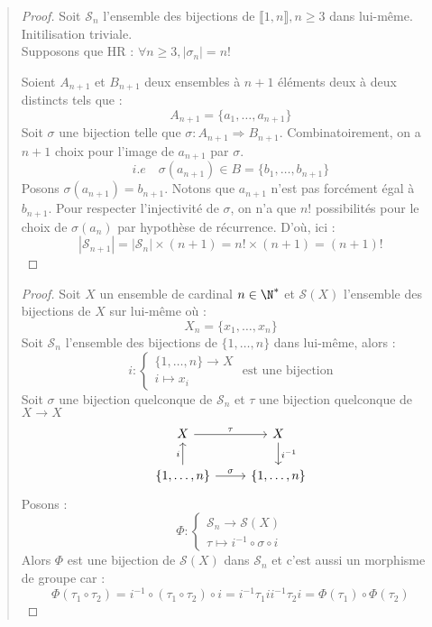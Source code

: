 \begin{quote}
	\footnotesize
	\begin{proof}
		Soit $\mathcal{S}_n$ l'ensemble des bijections de $\llbracket 1,n \rrbracket, n \geq 3$ dans lui-même.
		Initilisation triviale. \\
		Supposons que HR : $ \forall n \geq 3, | \sigma_n | = n ! $

		Soient $A_{n+1}$ et $B_{n+1}$ deux ensembles à $n+1$ éléments deux à deux distincts tels que :
			\[ A_{n+1} = \{a_1, \dots, a_{n+1} \} \]
		Soit $\sigma$ une bijection telle que $ \sigma : A_{n+1} \Longrightarrow B_{n+1}$.
		Combinatoirement, on a $n+1$ choix pour l'image de $a_{n+1}$ par $\sigma$.
			\[ i.e \quad \sigma(a_{n+1}) \in B = \{b_1, \dots, b_{n+1} \} \]
		Posons $ \sigma(a_{n+1}) = b_{n+1}$. Notons que $a_{n+1}$ n'est pas forcément égal à $b_{n+1}$.
		Pour respecter l'injectivité de $\sigma$, on n'a que $n !$ possibilités pour le choix de $\sigma(a_n)$ par hypothèse de récurrence.
		D'où, ici :
			\[ |\mathcal{S}_{n+1}| = |\mathcal{S}_n| \times (n+1) = n! \times (n+1) = (n+1)! \]
	\end{proof}
	\begin{proof}
		Soit $X$ un ensemble de cardinal $n \in \N^*$ et $\mathcal{S}(X)$ l'ensemble des bijections de $X$ sur lui-même où :
			\[ X_n = \{x_1, \dots, x_n \} \]
		Soit $\mathcal{S}_n$ l'ensemble des bijections de $\{1, \dots, n\}$ dans lui-même, alors :
			\[ i :  
				\begin{cases}
					\{1,\dots,n\} \longrightarrow X \\
					i \longmapsto x_i 
				\end{cases}  \text{ est une bijection} \]
		Soit $\sigma$ une bijection quelconque de $\mathcal{S}_n$ et $\tau$ une bijection quelconque de $ X \longrightarrow X$ 
		$$
		\begin{tikzcd}
			X \arrow[r, "\tau"]
				& X \arrow[d, "i^{-1}"] \\
			\{1,\dots,n\} \arrow[r, "\sigma"] \arrow[u, "i"] 
				& \{1,\dots,n\}
		\end{tikzcd}
		$$
		Posons :
				\[ \Phi : 
					\begin{cases}
						\mathcal{S}_n \longrightarrow \mathcal{S}(X) \\
						\tau \longmapsto i^{-1} \circ \sigma \circ i 
					\end{cases} \]
		Alors $\Phi$ est une bijection de $\mathcal{S}(X)$ dans $\mathcal{S}_n$ et c'est aussi un morphisme de groupe car :
					\[ \Phi(\tau_1 \circ \tau_2) = i^{-1} \circ (\tau_1 \circ \tau_2) \circ i = i^{-1} \tau_1 i i^{-1} \tau_2 i = \Phi(\tau_1) \circ \Phi(\tau_2) \]
	\end{proof}
	\normalsize
\end{quote}

